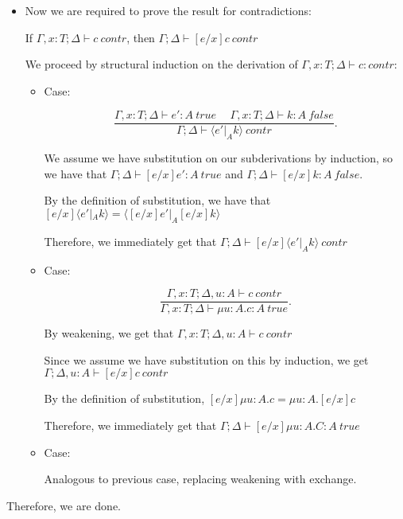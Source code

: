 \begin{enumerate}
\begin{itemize}
          \item
            Now we are required to prove the result for contradictions:

            If $\Gamma, x : T;\Delta \vdash c\ contr$, then $\Gamma;\Delta \vdash [e / x]c\ contr$

            We proceed by structural induction on the derivation of $\Gamma, x : T;\Delta \vdash c:contr$:

            \begin{itemize}
              \item
                Case:

                \[
                  \frac{\Gamma,x : T;\Delta \vdash e': A\ true \hspace{15pt}\Gamma,x:T;\Delta \vdash k: A\ false}{\Gamma;\Delta \vdash \langle e' |_A k\rangle\ contr}
                .\] 

                We assume we have substitution on our subderivations by induction, so we have that $\Gamma;\Delta \vdash [e / x]e': A\ true$ and $\Gamma;\Delta \vdash [e / x]k: A\ false$.

                By the definition of substitution, we have that $[e / x]\langle e' |_A k\rangle = \langle [e / x]e' |_A [e / x]k\rangle$

                Therefore, we immediately get that $\Gamma;\Delta \vdash [e / x] \langle e'|_Ak\rangle\ contr$

              \item

                Case:

                \[
                  \frac{\Gamma,x : T;\Delta, u :A \vdash c\ contr}{\Gamma,x : T;\Delta \vdash \mu u: A. c : A\ true}
                .\] 

                By weakening, we get that $\Gamma, x : T;\Delta, u : A \vdash c\ contr$

                Since we assume we have substitution on this by induction, we get $\Gamma;\Delta, u :A \vdash [e / x]c\ contr$

                By the definition of substitution, $[e / x]\mu u : A.c = \mu u: A. [e / x]c$

                Therefore, we immediately get that $\Gamma;\Delta \vdash [e / x]\mu u : A.C : A\ true$

              \item
                Case:

                Analogous to previous case, replacing weakening with exchange.




            \end{itemize}
        \end{itemize}

        Therefore, we are done.


    \end{enumerate}

